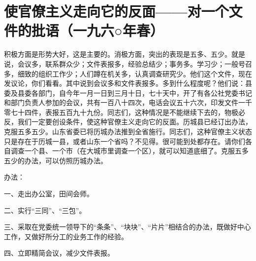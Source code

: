 \section[使官僚主义走向它的反面——对一个文件的批语（一九六○年春）]{使官僚主义走向它的反面——对一个文件的批语（一九六○年春）}


积极方面是形势大好，这是主要的。消极方面，突出的表现是五多、五少。就是说，会议多，联系群众少；文件表报多，经验总结少；事务多。学习少；一般号召多，细致的组织工作少；人们蹲在机关多，认真调查研究少。他们这个文件，现在发议论，你们看看。其中说到会议多和文件表报多。多到什么程度呢？他们说：县委及县委各部门，自今年一月一日到三月十日，七十天中，开了有各公社党委书记和部门负责人参加的会议，共有一百八十四次，电话会议五十六次，印发文件一千零七十四件，表报五百九十九份。同志们，这种情况是不能继续下去的，物极必反，我们一定要创设条件，使这种官僚主义走向它的反面。历城县已经订出办法，克服五多五少。山东省委已将历城办法推到全省施行。同志们，这种官僚主义状态只是存在于历城一县，或者山东一个省吗？不见得。很可能到处都存在。请你们各自调查一个县、一个市（在大城市里调查一个区），就可以知道底细了。克服五多五少的办法，可以仿照历城办法。

办法：

一、走出办公室，田间会师。

二、实行“三同”、“三包”。

三、采取在党委统一领导下的“条条”、“块块”、“片片”相结合的办法，既做好中心工作，又做好所分工的业务工作的经验。

四、立即精简会议，减少文件表报。


